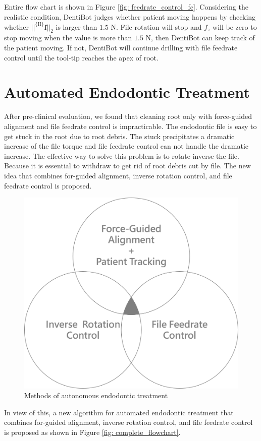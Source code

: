 \vspace{-10mm}
\par
Entire flow chart is shown in Figure \ref{fig: feedrate_control_fc}. Considering the realistic condition, DentiBot judges whether patient moving happens by checking whether $||^{\mathrm{\lbrace H \rbrace}}\!\boldsymbol{f}||_2$ is larger than $1.5$ N. File rotation will stop and $f_z$ will be zero to stop moving when the value is more than $1.5$ N, then DentiBot can keep track of the patient moving. If not, DentiBot will continue drilling with file feedrate control until the tool-tip reaches the apex of root. 

\section{Automated Endodontic Treatment}
\hspace*{6mm}After pre-clinical evaluation, we found that cleaning root only with force-guided alignment and file feedrate control is impracticable. The endodontic file is easy to get stuck in the root due to root debris. The stuck precipitates a dramatic increase of the file torque and file feedrate control can not handle the dramatic increase. The effective way to solve this problem is to rotate inverse the file. Because it is essential to withdraw to get rid of root debris cut by file. The new idea that combines for-guided alignment, inverse rotation control, and file feedrate control is proposed.
\begin{figure}[htbp]
\begin{center}
\includegraphics[width=0.6\linewidth]{Images/combine.png}
\end{center}
\caption{Methods of autonomous endodontic treatment}
\label{fig: combine}
\end{figure}
\par
In view of this, a new algorithm for automated endodontic treatment that combines for-guided alignment, inverse rotation control, and file feedrate control  is proposed as shown in Figure \ref{fig: complete_flowchart}.
